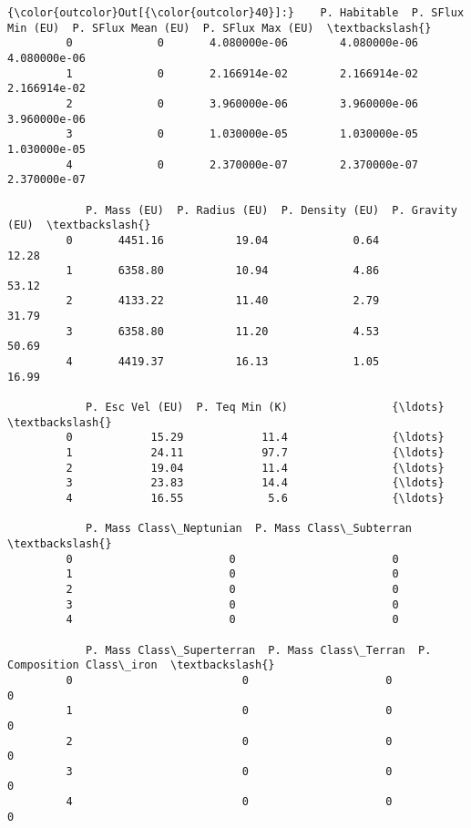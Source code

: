 \documentclass[11pt]{article}
\begin{document}
\begin{Verbatim}[commandchars=\\\{\}]
{\color{outcolor}Out[{\color{outcolor}40}]:}    P. Habitable  P. SFlux Min (EU)  P. SFlux Mean (EU)  P. SFlux Max (EU)  \textbackslash{}
         0             0       4.080000e-06        4.080000e-06       4.080000e-06   
         1             0       2.166914e-02        2.166914e-02       2.166914e-02   
         2             0       3.960000e-06        3.960000e-06       3.960000e-06   
         3             0       1.030000e-05        1.030000e-05       1.030000e-05   
         4             0       2.370000e-07        2.370000e-07       2.370000e-07   
         
            P. Mass (EU)  P. Radius (EU)  P. Density (EU)  P. Gravity (EU)  \textbackslash{}
         0       4451.16           19.04             0.64            12.28   
         1       6358.80           10.94             4.86            53.12   
         2       4133.22           11.40             2.79            31.79   
         3       6358.80           11.20             4.53            50.69   
         4       4419.37           16.13             1.05            16.99   
         
            P. Esc Vel (EU)  P. Teq Min (K)                {\ldots}                  \textbackslash{}
         0            15.29            11.4                {\ldots}                   
         1            24.11            97.7                {\ldots}                   
         2            19.04            11.4                {\ldots}                   
         3            23.83            14.4                {\ldots}                   
         4            16.55             5.6                {\ldots}                   
         
            P. Mass Class\_Neptunian  P. Mass Class\_Subterran  \textbackslash{}
         0                        0                        0   
         1                        0                        0   
         2                        0                        0   
         3                        0                        0   
         4                        0                        0   
         
            P. Mass Class\_Superterran  P. Mass Class\_Terran  P. Composition Class\_iron  \textbackslash{}
         0                          0                     0                          0   
         1                          0                     0                          0   
         2                          0                     0                          0   
         3                          0                     0                          0   
         4                          0                     0                          0   
         

\end{Verbatim}
\end{document}
